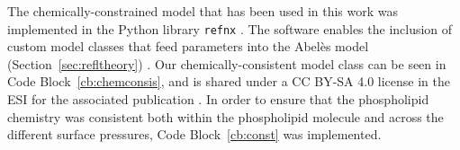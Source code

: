 The chemically-constrained model that has been used in this work was implemented in the Python library \texttt{refnx} \cite{nelson_refnx_2019,nelson_refnx_2019-1}.
The software enables the inclusion of custom model classes that feed parameters into the Abel\`{e}s model (Section~\ref{sec:refltheory}) \cite{abeles_sur_1948,parratt_surface_1954}.
Our chemically-consistent model class can be seen in Code Block~\ref{cb:chemconsis}, and is shared under a CC BY-SA 4.0 license in the ESI for the associated publication \cite{mccluskey_lipids_at_airdes_2019}.
In order to ensure that the phospholipid chemistry was consistent both within the phospholipid molecule and across the different surface pressures, Code Block~\ref{cb:const} was implemented.
%
\begin{figure}
    \centering
        
\end{figure}
%
\begin{figure}
    \centering
        
\end{figure}
%

